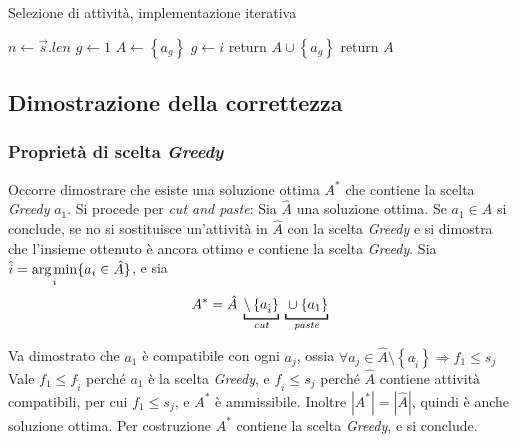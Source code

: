 \begin{algorithm}[H]
\caption{Selezione di attività, implementazione iterativa}\label{alg:asiter}
\begin{algorithmic}[1]
        \State $n \gets \vec{s}.len$
        \State $g \gets 1$
        \State $A \gets \left\{ a_g \right\}$
                \State $g \gets i$
                \State return $A \cup \left\{ a_g \right\}$
            \EndIf
        \EndFor
        \State return $A$
    \EndProcedure
\end{algorithmic}
\end{algorithm}

\subsection{Dimostrazione della correttezza}

\subsubsection{Proprietà di scelta \emph{Greedy}}

Occorre dimostrare che esiste una soluzione ottima $A^*$ che contiene la scelta \emph{Greedy} ${a_1}$. Si procede per \emph{cut and paste}: Sia $\hat{A}$ una soluzione ottima. Se ${a_1} \in \hat{A}$ si conclude, se no si sostituisce un'attività in $\hat{A}$ con la scelta \emph{Greedy} e si dimostra che l'insieme ottenuto è ancora ottimo e contiene la scelta \emph{Greedy}.
Sia $\hat{i} =  \operatorname*{arg\,min}\limits_i \{ a_i \in \hat{A} \} $, e sia
\[
A^* = \hat{A} 
\;
\underbracket[1pt]{
\setminus \left\{ a_{\hat{i}} \right\} 
}_{\text{\emph{cut}}}
\;
\underbracket[1pt]{
\vphantom{ \setminus \left\{ a_{\hat{i}} \right\} }
\cup \left\{ a_1 \right\}
}_{\text{\emph{paste}}}
\]

Va dimostrato che $a_1$ è compatibile con ogni $a_j$, ossia 
$\forall a_j \in \hat{A} \setminus \left\{ a_{\hat{i}} \right\} \Rightarrow f_1 \leq s_j$
\\
Vale $f_1 \leq f_{\hat{i}}$ perché $a_1$ è la scelta \emph{Greedy}, e $f_{\hat{i}} \leq s_j$ perché $\hat{A}$ contiene attività compatibili, per cui $f_1 \leq s_j$, e $A^*$ è ammissibile. Inoltre $|A^*| = |\hat{A}|$, quindi è anche soluzione ottima. Per costruzione $A^*$ contiene la scelta \emph{Greedy}, e si conclude.


